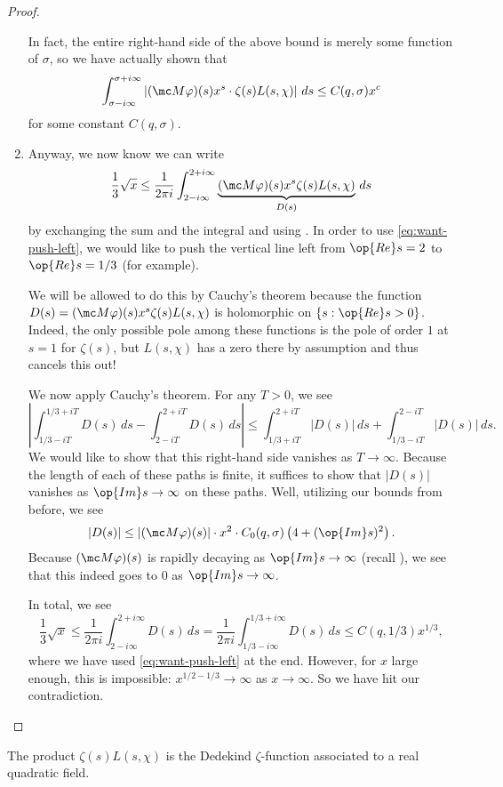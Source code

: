 \documentclass[../notes.tex]{subfiles}
\begin{document}
\begin{proof}
\begin{enumerate}
		In fact, the entire right-hand side of the above bound is merely some function of $\sigma$, so we have actually shown that
		\begin{equation}
			\int_{\sigma-i\infty}^{\sigma+i\infty}\left|(\mc M\varphi)(s)x^s\cdot\zeta(s)L(s,\chi)\right|\,ds\le C(q,\sigma)x^c \label{eq:want-push-left}
		\end{equation}
		for some constant $C(q,\sigma)$.

		\item Anyway, we now know we can write
		\[\frac13\sqrt x\le\frac1{2\pi i}\int_{2-i\infty}^{2+i\infty}\underbrace{(\mc M\varphi)(s)x^{s}\zeta(s)L(s,\chi)}_{D(s)}\,ds\]
		by exchanging the sum and the integral and using . In order to use \eqref{eq:want-push-left}, we would like to push the vertical line left from $\op{Re}s=2$ to $\op{Re}s=1/3$ (for example).
		
		We will be allowed to do this by Cauchy's theorem because the function $D(s)=(\mc M\varphi)(s)x^s\zeta(s)L(s,\chi)$ is holomorphic on $\{s:\op{Re}s>0\}$. Indeed, the only possible pole among these functions is the pole of order $1$ at $s=1$ for $\zeta(s)$, but $L(s,\chi)$ has a zero there by assumption and thus cancels this out!

		We now apply Cauchy's theorem. For any $T>0$, we see
		\[\left|\int_{1/3-iT}^{1/3+iT}D(s)\,ds-\int_{2-iT}^{2+iT}D(s)\,ds\right|\le\int_{1/3+iT}^{2+iT}|D(s)|\,ds+\int_{1/3-iT}^{2-iT}|D(s)|\,ds.\]
		We would like to show that this right-hand side vanishes as $T\to\infty$. Because the length of each of these paths is finite, it suffices to show that $|D(s)|$ vanishes as $\op{Im}s\to\infty$ on these paths. Well, utilizing our bounds from before, we see
		\[|D(s)|\le|(\mc M\varphi)(s)|\cdot x^2\cdot C_0(q,\sigma)\left(4+(\op{Im}s)^2\right).\]
		Because $(\mc M\varphi)(s)$ is rapidly decaying as $\op{Im}s\to\infty$ (recall ), we see that this indeed goes to $0$ as $\op{Im}s\to\infty$.

		In total, we see
		\[\frac13\sqrt x\le\frac1{2\pi i}\int_{2-i\infty}^{2+i\infty}D(s)\,ds=\frac1{2\pi i}\int_{1/3-i\infty}^{1/3+i\infty}D(s)\,ds\le C(q,1/3)x^{1/3},\]
		where we have used \eqref{eq:want-push-left} at the end. However, for $x$ large enough, this is impossible: $x^{1/2-1/3}\to\infty$ as $x\to\infty$. So we have hit our contradiction.
		\qedhere
	\end{enumerate}
\end{proof}
\begin{remark}
	The product $\zeta(s)L(s,\chi)$ is the Dedekind $\zeta$-function associated to a real quadratic field.
\end{remark}
\end{document}
